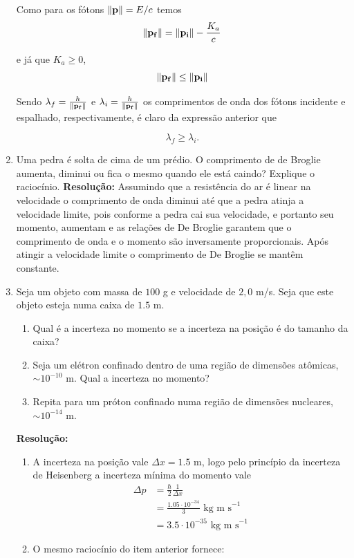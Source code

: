 \documentclass[a4paper, 12pt, notitlepage]{article}
\begin{document}
\begin{enumerate}
Como para os fótons $\norm{\vb{p}} = E/c$ temos
\begin{equation*}
\norm{\vb{p_f}} = \norm{\vb{p_i}} - \frac{K_a}{c}
\end{equation*}

\noindent e já que $K_a \ge 0$,
\begin{equation*}
\norm{\vb{p_f}} \le \norm{\vb{p_i}}
\end{equation*}

Sendo $\lambda_f = \frac{h}{\norm{\vb{p_f}}}$ e $\lambda_i = \frac{h}{\norm{\vb{p_f}}}$ os comprimentos de onda dos fótons incidente e espalhado, respectivamente, é claro da expressão anterior que

\begin{equation*}
\lambda_f \ge \lambda_i.
\end{equation*}

\item Uma pedra é solta de cima de um prédio. O comprimento de de Broglie aumenta, diminui ou fica o mesmo quando ele está caindo? Explique o raciocínio.\linebreak
\textbf{Resolução: }\linebreak
Assumindo que a resistência do ar é linear na velocidade o comprimento de onda diminui até que a pedra atinja a velocidade limite, pois conforme a pedra cai sua velocidade, e portanto seu momento, aumentam e as relações de De Broglie garantem que o comprimento de onda e o momento são inversamente proporcionais. Após atingir a velocidade limite o comprimento de De Broglie se mantêm constante.

\item Seja um objeto com massa de $100$ g e velocidade de $2,0$ m/s. Seja que este objeto esteja numa caixa de $1.5$ m.
\begin{enumerate}
  \item Qual é a incerteza no momento se a incerteza na posição é do tamanho da caixa?
  \item Seja um elétron confinado dentro de uma região de dimensões atômicas, $\sim 10^{-10}$ m. Qual a incerteza no momento?
  \item Repita para um próton confinado numa região de dimensões nucleares, $\sim 10^{-14}$ m.
\end{enumerate}
\textbf{Resolução: }\linebreak
\begin{enumerate}
  \item A incerteza na posição vale $\Delta x = 1.5$ m, logo pelo princípio da incerteza de Heisenberg a incerteza mínima do momento vale
  \begin{align*}
  \Delta p &= \frac{\hbar}{2} \frac{1}{\Delta x} \\
  &= \frac{1.05 \cdot 10^{-34}}{3} \text{ kg m s}^{-1} \\
  &= 3.5 \cdot 10^{-35} \text{ kg m s}^{-1}
  \end{align*}
  \item O mesmo raciocínio do item anterior fornece:


\end{enumerate}
\end{enumerate}
\end{document}
